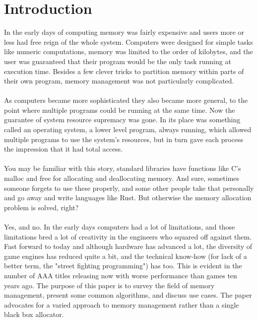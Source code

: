 \documentclass{report}
\begin{document}
\chapter{Introduction}
In the early days of computing memory was fairly expensive and users more or less had free reign of the whole system. Computers were designed for simple tasks like numeric computations, memory was limited to the order of kilobytes, and the user was guaranteed that their program would be the only task running at execution time. Besides a few clever tricks to partition memory within parts of their own program, memory management was not particularly complicated.\\
\\
As computers became more sophisticated they also became more general, to the point where multiple programs could be running at the same time. Now the guarantee of system resource supremacy was gone. In its place was something called an operating system, a lower level program, always running, which allowed multiple programs to use the system's resources, but in turn gave each process the impression that it had total access.\\
\\
You may be familiar with this story, standard libraries have functions like C's malloc and free for allocating and deallocating memory. And sure, sometimes someone forgets to use these properly, and some other people take that personally and go away and write languages like Rust. But otherwise the memory allocation problem is solved, right?\\
\\
Yes, and no. In the early days computers had a lot of limitations, and those limitations bred a lot of creativity in the engineers who squared off against them. Fast forward to today and although hardware has advanced a lot, the diversity of game engines has reduced quite a bit, and the technical know-how (for lack of a better term, the "street fighting programming") has too. This is evident in the number of AAA titles releasing now with worse performance than games ten years ago. The purpose of this paper is to survey the field of memory management, present some common algorithms, and discuss use cases. The paper advocates for a varied approach to memory management rather than a single black box allocator.
\end{document}
